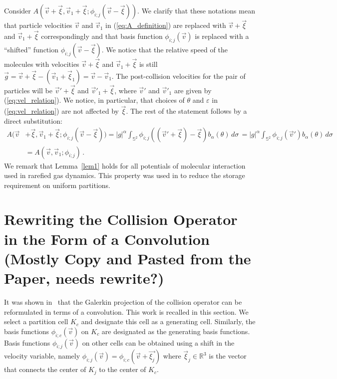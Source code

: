 \documentclass[12pt]{CSUNthesis}
\def\Sbb{\mathbb{S}}
\begin{document}
\proof
Consider $A(\vec{v}+\vec{\xi},\vec{v}_{1}+\vec{\xi};\phi_{i;j}(\vec{v}-\vec{\xi}))$. We clarify that these notations mean that
particle velocities $\vec{v}$ and $\vec{v}_{1}$ in (\ref{eq:A_definition}) are replaced with $\vec{v}+\vec{\xi}$ and $\vec{v}_{1}+\vec{\xi}$
correspondingly and that basis function $\phi_{i;j}(\vec{v})$ is replaced with a ``shifted'' function 
$\phi_{i;j}(\vec{v}-\vec{\xi})$. We notice that the relative speed of the molecules with velocities $\vec{v}+\vec{\xi}$ 
and $\vec{v}_{1}+\vec{\xi}$ is still $\vec{g}=\vec{v}+\vec{\xi}-(\vec{v}_{1}+\vec{\xi}_{1})=\vec{v}-\vec{v}_{1}$. 
The post-collision velocities for the pair of particles will be $\vec{v}'+\vec{\xi}$ and $\vec{v}'_{1}+\vec{\xi}$, where $\vec{v}'$ and $\vec{v}'_{1}$ are given by (\ref{eq:vel_relation}). We notice, in particular, that choices of $\theta$ and $\varepsilon$ in 
(\ref{eq:vel_relation}) are not affected by $\vec{\xi}$. The rest of the statement follows by a direct substitution:
\begin{align*}
A(\vec{v}&+\vec{\xi},\vec{v}_{1}+\vec{\xi};\phi_{i;j}(\vec{v}-\vec{\xi})) = |g|^{\alpha} \int_{\Sbb^2} \phi_{i;j}((\vec{v}'+\vec{\xi})-\vec{\xi}) b_{\alpha}(\theta)\, d\sigma\,= |g|^{\alpha} \int_{\Sbb^2} \phi_{i;j}(\vec{v}') b_{\alpha}(\theta)\, d\sigma \\
&  = A(\vec{v},\vec{v}_{1};\phi_{i;j})\, . 
\end{align*}
\endproof
We remark that Lemma~{\ref{lem1}} holds for all potentials of molecular 
interaction used in rarefied gas dynamics. This property was used in 
\cite{AlekseenkoJosyula2012a} to reduce the storage requirement 
on uniform partitions. 

\section{Rewriting the Collision Operator in the Form of a Convolution (Mostly Copy and Pasted from the Paper, needs rewrite?)}
It was shown in~\cite{AlekseenkoNguyenWood2015} that the Galerkin projection of the collision operator can be reformulated in terms of a convolution. This work is recalled in this section. 
We select a partition cell $K_c$ and designate this cell as a generating cell. 
Similarly, the basis functions $\phi_{i;c}(\vec{v})$ on $K_c$ are designated as the generating basis functions. 
Basis functions $\phi_{i;j}(\vec{v})$ on other cells can be obtained using a shift in the velocity variable, namely $\phi_{i;j} (\vec{v})=\phi_{i;c} (\vec{v}+\vec{\xi_{j}})$ where $ \vec{\xi}_{j} \in \mathbb{R}^3$ is the vector that connects the center of $K_j$ to the center of $K_c$.
\end{document}
